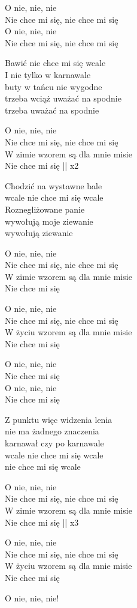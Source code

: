 \begin{text}
\vin O nie, nie, nie\\
\vin Nie chce mi się, nie chce mi się\\
\vin O nie, nie, nie\\
\vin Nie chce mi się, nie chce mi się

Bawić nie chce mi się wcale\\
I nie tylko w karnawale\\
buty w tańcu nie wygodne\\
trzeba wciąż uważać na spodnie\\
trzeba uważać na spodnie


\vin O nie, nie, nie\\
\vin Nie chce mi się, nie chce mi się\\
\vin W zimie wzorem są dla mnie misie\\
\vin Nie chce mi się || x2

Chodzić na wystawne bale\\
wcale nie chce mi się wcale\\
Roznegliżowane panie\\
wywołują moje ziewanie\\
wywołują ziewanie

\vin O nie, nie, nie\\
\vin Nie chce mi się, nie chce mi się\\
\vin W zimie wzorem są dla mnie misie\\
\vin Nie chce mi się

\vin O nie, nie, nie\\
\vin Nie chce mi się, nie chce mi się\\
\vin W życiu wzorem są dla mnie misie\\
\vin Nie chce mi się

\vin O nie, nie, nie\\
\vin Nie chce mi się\\
\vin O nie, nie, nie\\
\vin Nie chce mi się

Z punktu więc widzenia lenia\\
nie ma żadnego znaczenia\\
karnawał czy po karnawale\\
wcale nie chce mi się wcale\\
nie chce mi się wcale


\vin O nie, nie, nie\\
\vin Nie chce mi się, nie chce mi się\\
\vin W zimie wzorem są dla mnie misie\\
\vin Nie chce mi się || x3

\vin O nie, nie, nie\\
\vin Nie chce mi się, nie chce mi się\\
\vin W życiu wzorem są dla mnie misie\\
\vin Nie chce mi się

\vin O nie, nie, nie!
\end{text}
